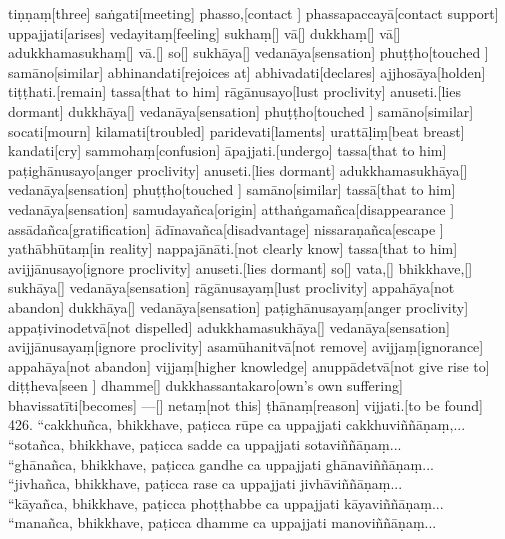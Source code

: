 \documentclass[9pt]{article}
\begin{document}
\begingl
tiṇṇaṃ[three] saṅgati[meeting] phasso,[contact ] phassapaccayā[contact support] uppajjati[arises] vedayitaṃ[feeling] sukhaṃ[] vā[] dukkhaṃ[] vā[] adukkhamasukhaṃ[] vā.[] so[] sukhāya[] vedanāya[sensation] phuṭṭho[touched ] samāno[similar] abhinandati[rejoices at] abhivadati[declares] ajjhosāya[holden] tiṭṭhati.[remain] tassa[that to him] rāgānusayo[lust proclivity] anuseti.[lies dormant] dukkhāya[] vedanāya[sensation] phuṭṭho[touched ] samāno[similar] socati[mourn] kilamati[troubled] paridevati[laments] urattāḷiṃ[beat breast] kandati[cry] sammohaṃ[confusion] āpajjati.[undergo] tassa[that to him] paṭighānusayo[anger proclivity] anuseti.[lies dormant] adukkhamasukhāya[] vedanāya[sensation] phuṭṭho[touched ] samāno[similar] tassā[that to him] vedanāya[sensation] samudayañca[origin] atthaṅgamañca[disappearance ] assādañca[gratification] ādīnavañca[disadvantage] nissaraṇañca[escape ] yathābhūtaṃ[in reality] nappajānāti.[not clearly know] tassa[that to him] avijjānusayo[ignore proclivity] anuseti.[lies dormant] so[] vata,[] bhikkhave,[] sukhāya[] vedanāya[sensation] rāgānusayaṃ[lust proclivity] appahāya[not abandon] dukkhāya[] vedanāya[sensation] paṭighānusayaṃ[anger proclivity] appaṭivinodetvā[not dispelled] adukkhamasukhāya[] vedanāya[sensation] avijjānusayaṃ[ignore proclivity] asamūhanitvā[not remove] avijjaṃ[ignorance] appahāya[not abandon] vijjaṃ[higher knowledge] anuppādetvā[not give rise to] diṭṭheva[seen ] dhamme[] dukkhassantakaro[own's own suffering] bhavissatīti[becomes] —[] netaṃ[not this] ṭhānaṃ[reason] vijjati.[to be found] 
\endgl
\pagebreak\\
426. “cakkhuñca, bhikkhave, paṭicca rūpe ca uppajjati cakkhuviññāṇaṃ,...\\
“sotañca, bhikkhave, paṭicca sadde ca uppajjati sotaviññāṇaṃ...\\

“ghānañca, bhikkhave, paṭicca gandhe ca uppajjati ghānaviññāṇaṃ...\\

“jivhañca, bhikkhave, paṭicca rase ca uppajjati jivhāviññāṇaṃ...\\

“kāyañca, bhikkhave, paṭicca phoṭṭhabbe ca uppajjati kāyaviññāṇaṃ...\\

“manañca, bhikkhave, paṭicca dhamme ca uppajjati manoviññāṇaṃ...\\\
\end{document}
